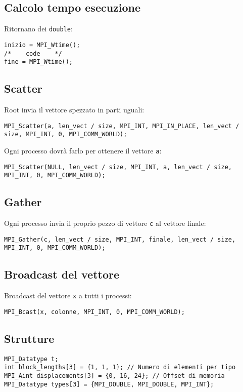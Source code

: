 \documentclass{article}
\begin{document}
\subsection{Calcolo tempo esecuzione}
Ritornano dei \texttt{double}:
\begin{verbatim}
inizio = MPI_Wtime();
/*    code    */
fine = MPI_Wtime();
\end{verbatim}

\subsection{Scatter}
Root invia il vettore spezzato in parti uguali:
\begin{verbatim}
MPI_Scatter(a, len_vect / size, MPI_INT, MPI_IN_PLACE, len_vect / size, MPI_INT, 0, MPI_COMM_WORLD);
\end{verbatim}

Ogni processo dovrà farlo per ottenere il vettore \texttt{a}:
\begin{verbatim}
MPI_Scatter(NULL, len_vect / size, MPI_INT, a, len_vect / size, MPI_INT, 0, MPI_COMM_WORLD);
\end{verbatim}

\subsection{Gather}
Ogni processo invia il proprio pezzo di vettore \texttt{c} al vettore finale:
\begin{verbatim}
MPI_Gather(c, len_vect / size, MPI_INT, finale, len_vect / size, MPI_INT, 0, MPI_COMM_WORLD);
\end{verbatim}

\subsection{Broadcast del vettore}
Broadcast del vettore \texttt{x} a tutti i processi:
\begin{verbatim}
MPI_Bcast(x, colonne, MPI_INT, 0, MPI_COMM_WORLD);
\end{verbatim}

\subsection{Strutture}
\begin{verbatim}
MPI_Datatype t;
int block_lengths[3] = {1, 1, 1}; // Numero di elementi per tipo
MPI_Aint displacements[3] = {0, 16, 24}; // Offset di memoria
MPI_Datatype types[3] = {MPI_DOUBLE, MPI_DOUBLE, MPI_INT};
\end{verbatim}
\end{document}
